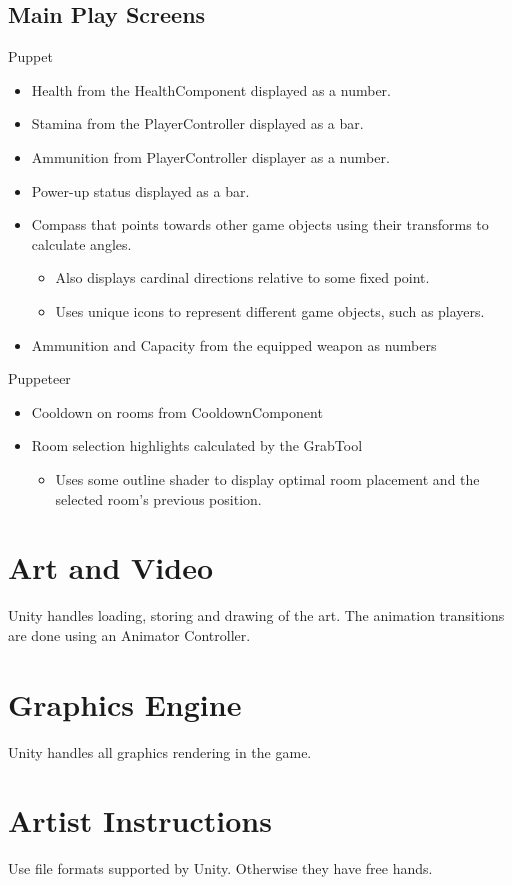 \documentclass[11pt]{article}
\begin{document}
\subsection{Main Play Screens}
Puppet
\begin{itemize}
	\item Health from the HealthComponent displayed as a number.
	\item Stamina from the PlayerController displayed as a bar.
	\item Ammunition from PlayerController displayer as a number.
	\item Power-up status displayed as a bar.
	\item Compass that points towards other game objects using their transforms to calculate angles.
	\begin{itemize}
		\item Also displays cardinal directions relative to some fixed point.
		\item Uses unique icons to represent different game objects, such as players.
	\end{itemize}
	\item Ammunition and Capacity from the equipped weapon as numbers
\end{itemize}
Puppeteer
\begin{itemize}
	\item Cooldown on rooms from CooldownComponent
	\item Room selection highlights calculated by the GrabTool
	\begin{itemize}
		\item Uses some outline shader to display optimal room placement and the selected room’s previous position.
	\end{itemize}
\end{itemize}

\section{Art and Video}
Unity handles loading, storing and drawing of the art. The animation transitions are done using an Animator Controller.
\section{Graphics Engine}
Unity handles all graphics rendering in the game.
\section{Artist Instructions}
Use file formats supported by Unity. Otherwise they have free hands.
\end{document}

